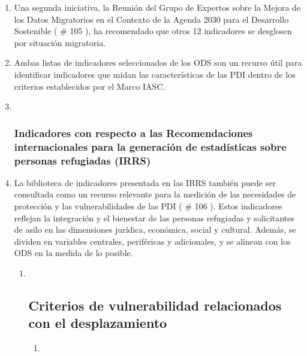 \documentclass[
]{book}
\begin{document}
\begin{enumerate}
\def\labelenumi{\arabic{enumi}.}
\item
  Una segunda iniciativa, la Reunión del Grupo de Expertos sobre la Mejora de los Datos Migratorios en el Contexto de la Agenda 2030 para el Desarrollo Sostenible (
  \# 105
  ), ha recomendado que otros 12 indicadores se desglosen por situación migratoria.
\item
  Ambas listas de indicadores seleccionados de los ODS son un recurso útil para identificar indicadores que midan las características de las PDI dentro de los criterios establecidos por el Marco IASC.
\item ~
  \hypertarget{indicadores-con-respecto-a-las-recomendaciones-internacionales-para-la-generaciuxf3n-de-estaduxedsticas-sobre-personas-refugiadas-irrs}{%
  \subsubsection{Indicadores con respecto a las Recomendaciones internacionales para la generación de estadísticas sobre personas refugiadas (IRRS)}\label{indicadores-con-respecto-a-las-recomendaciones-internacionales-para-la-generaciuxf3n-de-estaduxedsticas-sobre-personas-refugiadas-irrs}}
\item
  La biblioteca de indicadores presentada en las IRRS también puede ser consultada como un recurso relevante para la medición de las necesidades de protección y las vulnerabilidades de las PDI (
  \# 106
  ). Estos indicadores reflejan la integración y el bienestar de las personas refugiadas y solicitantes de asilo en las dimensiones jurídica, económica, social y cultural. Además, se dividen en variables centrales, periféricas y adicionales, y se alinean con los ODS en la medida de lo posible.

  \begin{enumerate}
  \def\labelenumii{\arabic{enumii}.}
  \item ~
    \hypertarget{criterios-de-vulnerabilidad-relacionados-con-el-desplazamiento}{%
    \subsection{Criterios de vulnerabilidad relacionados con el desplazamiento}\label{criterios-de-vulnerabilidad-relacionados-con-el-desplazamiento}}

    \begin{enumerate}
    \def\labelenumiii{\arabic{enumiii}.}
    \item ~
      \hypertarget{criterios-y-subcriterios}{%
}
\end{enumerate}
\end{enumerate}
\end{enumerate}
\end{document}
